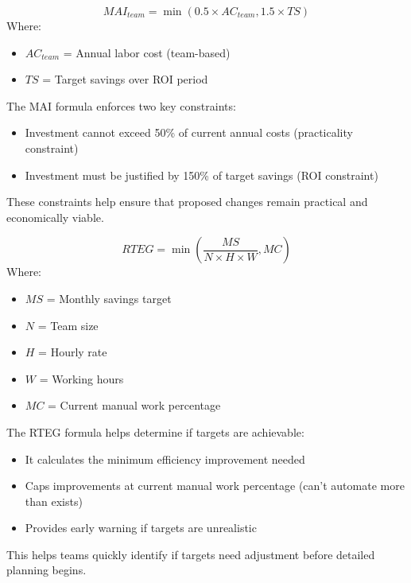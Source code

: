 \documentclass[12pt,a4paper]{article}
\newenvironment{definition}[1]
{\begin{mdframed}[style=definitionstyle,frametitle={Definition: #1}]}
{\end{mdframed}}
\newenvironment{explanation}
{\begin{mdframed}[style=explanationstyle,frametitle={Explanation}]}
{\end{mdframed}}
\newenvironment{observation}
{\begin{mdframed}[style=observationstyle,frametitle={Observation}]}
{\end{mdframed}}
\begin{document}
\begin{definition}{Maximum Allowable Investment (Team)}
\[
MAI_{team} = \min(0.5 \times AC_{team}, 1.5 \times TS)
\]
Where:
\begin{itemize}
    \item $AC_{team}$ = Annual labor cost (team-based)
    \item $TS$ = Target savings over ROI period
\end{itemize}
\end{definition}

\begin{observation}
The MAI formula enforces two key constraints:
\begin{itemize}
    \item Investment cannot exceed 50\% of current annual costs (practicality constraint)
    \item Investment must be justified by 150\% of target savings (ROI constraint)
\end{itemize}
These constraints help ensure that proposed changes remain practical and economically viable.
\end{observation}

\begin{definition}{Required Team Efficiency Gains}
\[
RTEG = \min\left(\frac{MS}{N \times H \times W}, MC\right)
\]
Where:
\begin{itemize}
    \item $MS$ = Monthly savings target
    \item $N$ = Team size
    \item $H$ = Hourly rate
    \item $W$ = Working hours
    \item $MC$ = Current manual work percentage
\end{itemize}
\end{definition}

\begin{explanation}
The RTEG formula helps determine if targets are achievable:
\begin{itemize}
    \item It calculates the minimum efficiency improvement needed
    \item Caps improvements at current manual work percentage (can't automate more than exists)
    \item Provides early warning if targets are unrealistic
\end{itemize}
This helps teams quickly identify if targets need adjustment before detailed planning begins.
\end{explanation}
\end{document}
